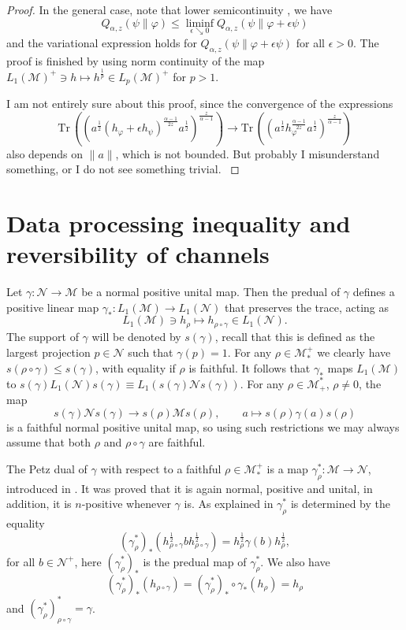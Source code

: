 \documentclass[12pt]{article}
\theoremstyle{definition}
\theoremstyle{remark}
\numberwithin{equation}{section}
\def\Me{\mathcal M}
\def\Ne{\mathcal N}
\def \Tr{\mathrm{Tr}\,}
\begin{document}
\begin{proof}
In the general case, note that lower semicontinuity \cite[]{kato2023onrenyi}, we have
\[
Q_{\alpha,z}(\psi\|\varphi)\le \liminf_{\epsilon\searrow 0}
Q_{\alpha,z}(\psi\|\varphi+\epsilon \psi) 
\]
and the variational expression holds for
$Q_{\alpha,z}(\psi\|\varphi+\epsilon\psi)$  for all $\epsilon>0$. The proof is finished 
by using norm continuity of the map $L_1(\Me)^+\ni h\mapsto h^{\frac1p}\in L_p(\Me)^+$ for
$p>1$. 
 

 {\color{red} I am not entirely sure about this proof, since the convergence of the
 expressions 
\[
 \Tr\left((a^{\frac12}(h_\varphi+\epsilon h_\psi)^{\frac{\alpha-1}{2z}}a^{\frac12})^{\frac{z}{\alpha-1}}\right)\to
 \Tr\left((a^{\frac12}h_\varphi^{\frac{\alpha-1}{2z}}a^{\frac12})^{\frac{z}{\alpha-1}}\right)\]
 also depends
 on $\|a\|$, which is not bounded. But probably I misunderstand something, or I do not see 
 something trivial. }
 
\end{proof}

\section{Data processing inequality and reversibility of channels}

Let  $\gamma: \Ne\to \Me$ be a normal positive unital map. Then the  predual of $\gamma$  defines a 
positive linear map $\gamma_*: L_1(\Me)\to L_1(\Ne)$ that preserves the trace, acting as
\[
L_1(\Me)\ni h_\rho\mapsto h_{\rho\circ\gamma} \in L_1(\Ne).
\]
The support
of $\gamma$ will be denoted by $s(\gamma)$, recall that this is defined as the largest projection
$p\in \Ne$ such that $\gamma(p)=1$. For any $\rho\in \Me_*^+$ we clearly have
$s(\rho\circ\gamma)\le s(\gamma)$, with equality if $\rho$ is faithful. 
It follows that $\gamma_*$ maps $L_1(\Me)$ to $s(\gamma)L_1(\Ne)s(\gamma)\equiv
L_1(s(\gamma)\Ne s(\gamma))$.  For any $\rho\in \Me_+^*$, $\rho\ne 0$, the map
\[
s(\gamma)\Ne s(\gamma)\to s(\rho)\Me s(\rho),\qquad a\mapsto s(\rho) \gamma(a)s(\rho)
\]
is a faithful normal positive unital map, so using such  restrictions we may always assume that both $\rho$ and $\rho\circ
\gamma$ are faithful.

The Petz dual  of $\gamma$ with respect to a faithful  $\rho\in \Me_*^+$
is a map $\gamma_\rho^*:\Me\to \Ne$,
introduced in \cite{petz1988sufficiency}. It was proved that it is again
normal, positive and unital, in addition, it is $n$-positive whenever $\gamma$ is. 
As explained in \cite{jencova2018renyi} $\gamma^*_\rho$ is determined by the equality
\begin{equation}\label{eq:petzdual}
(\gamma^*_\rho)_*(h_{\rho\circ\gamma}^{\frac12}bh_{\rho\circ\gamma}^{\frac12})=h_\rho^{\frac12}\gamma(b)h_\rho^{\frac12},
\end{equation}
for all $b\in \Ne^+$, here $(\gamma^*_\rho)_*$ is the predual map of $\gamma^*_\rho$. We
also have
\[
(\gamma^*_\rho)_*(h_{\rho\circ\gamma})=(\gamma^*_\rho)_*\circ \gamma_*(h_\rho)=h_\rho
\]
and $(\gamma_\rho^*)_{\rho\circ\gamma}^*=\gamma$.
\end{document}
